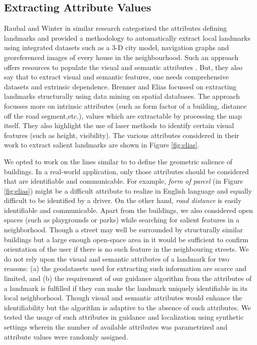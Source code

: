 \documentclass{iitkthesis}
\begin{document}
\subsection{Extracting Attribute Values}
Raubal and Winter \cite{raubal} in similar research categorized
the attributes defining landmarks and provided a methodology to 
automatically extract local landmarks using integrated datasets such as a
3-D city model, navigation graphs and georeferenced images of every house 
in the neighbourhood. Such an approach offers resources to populate the 
visual and semantic attributes . But, they also say that to extract 
visual and semantic features, one needs comprehensive datasets and 
extrinsic dependence.  Brenner and Elias \cite{brenner} focussed on 
extracting landmarks structurally using data mining on spatial 
databases. The approach focusses more on intrinsic attributes (such as 
form factor of a building, distance off the road segment,etc.), values 
which are extractable by processing the map itself. They also 
highlight the use of laser methods to identify certain visual features 
(such as height, visibility).  The various attributes considered in their 
work to extract salient landmarks are shown in Figure \ref{fig:elias}.

We opted to work on the lines similar to \cite{brenner} to define the 
geometric salience of buildings. In a real-world application, only those 
attributes should be considered that are identifiable and communicable. 
For example, \textit{form of parcel} (in Figure \ref{fig:elias}) might be 
a difficult attribute to realize in English language and equally 
difficult to be identified by a driver. On the other hand, \textit{road 
distance} is easily identifiable and communicable. Apart from the 
buildings, we also considered open spaces (such as playgrounds or parks) 
while searching for salient features in a neighborhood. Though a street 
may well be surrounded by structurally similar buildings but a large 
enough open-space area in it would be sufficient to confirm orientation 
of the user if there is no such feature in the neighbouring streets. We 
do not rely upon the visual and semantic attributes of a landmark for two 
reasons: (a) the geodatasets used for extracting such information are 
scarce and limited, and (b) the requirement of our guidance algorithm 
from the attributes of a landmark is fulfilled if they can make the 
landmark uniquely identifiable in its local neighborhood. Though visual 
and semantic attributes would enhance the identifiability but the 
algorithm is adaptive to the absence of such attributes. We tested the 
usage of such attributes in guidance and localization using synthetic 
settings wherein the number of available attributes was parametrized and 
attribute values were randomly assigned.
\end{document}
